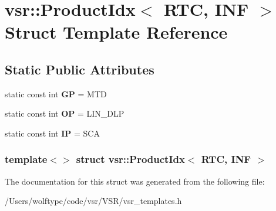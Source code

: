 \hypertarget{structvsr_1_1_product_idx_3_01_r_t_c_00_01_i_n_f_01_4}{\section{vsr\-:\-:Product\-Idx$<$ R\-T\-C, I\-N\-F $>$ Struct Template Reference}
\label{structvsr_1_1_product_idx_3_01_r_t_c_00_01_i_n_f_01_4}
}
\subsection*{Static Public Attributes}
\begin{DoxyCompactItemize}
\item 
\hypertarget{structvsr_1_1_product_idx_3_01_r_t_c_00_01_i_n_f_01_4_a5af2c8a37f39b43b03db41e8bd4af94f}{static const int {\bfseries G\-P} = M\-T\-D}\label{structvsr_1_1_product_idx_3_01_r_t_c_00_01_i_n_f_01_4_a5af2c8a37f39b43b03db41e8bd4af94f}

\item 
\hypertarget{structvsr_1_1_product_idx_3_01_r_t_c_00_01_i_n_f_01_4_a3a94fa2c484310880a06fec061abe5e6}{static const int {\bfseries O\-P} = L\-I\-N\-\_\-\-D\-L\-P}\label{structvsr_1_1_product_idx_3_01_r_t_c_00_01_i_n_f_01_4_a3a94fa2c484310880a06fec061abe5e6}

\item 
\hypertarget{structvsr_1_1_product_idx_3_01_r_t_c_00_01_i_n_f_01_4_af0266e572b3e5d8255e9f9d00bec92e7}{static const int {\bfseries I\-P} = S\-C\-A}\label{structvsr_1_1_product_idx_3_01_r_t_c_00_01_i_n_f_01_4_af0266e572b3e5d8255e9f9d00bec92e7}

\end{DoxyCompactItemize}
\subsubsection*{template$<$$>$ struct vsr\-::\-Product\-Idx$<$ R\-T\-C, I\-N\-F $>$}



The documentation for this struct was generated from the following file\-:\begin{DoxyCompactItemize}
\item 
/\-Users/wolftype/code/vsr/\-V\-S\-R/vsr\-\_\-templates.\-h\end{DoxyCompactItemize}
